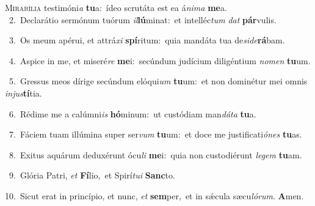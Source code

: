\lettrine{\initial\textcolor{\initialcolor}{M}}{irabília} testimóni\textit{a} \textbf{tu}\-a:~\star ídeo scrutáta est ea á\-\textit{ni}\-\textit{ma} \textbf{me}\-a.\\
{\numbfont\textcolor{\numbcolor}{~2.}}~Declarátio sermónum tuórum \textit{il}\-\textbf{lú}minat:~\star et intelléc\textit{tum} \textit{dat} \textbf{pár}\-vulis.\par
{\numbfont\textcolor{\numbcolor}{~3.}}~Os meum apérui, et attrá\textit{xi} \textbf{spí}\-ritum:~\star quia mandáta tua de\-\textit{si}\-\textit{de}\textbf{rá}bam.\par
{\numbfont\textcolor{\numbcolor}{~4.}}~Aspice in me, et miseré\textit{re} \textbf{me}\-i:~\star secúndum judícium diligéntium \textit{no}\-\textit{men} \textbf{tu}\-um.\par
{\numbfont\textcolor{\numbcolor}{~5.}}~Gressus meos dírige secúndum elóqui\textit{um} \textbf{tu}\-um:~\star et non dominétur mei omnis \textit{in}\-\textit{jus}\textbf{tí}tia.\par
{\numbfont\textcolor{\numbcolor}{~6.}}~Rédime me a calúmni\textit{is} \textbf{hó}\-minum:~\star ut custódiam man\-\textit{dá}\-\textit{ta} \textbf{tu}\-a.\par
{\numbfont\textcolor{\numbcolor}{~7.}}~Fáciem tuam illúmina super ser\textit{vum} \textbf{tu}\-um:~\star et doce me justificati\-\textit{ó}\-\textit{nes} \textbf{tu}\-as.\par
{\numbfont\textcolor{\numbcolor}{~8.}}~Exitus aquárum deduxérunt ócu\textit{li} \textbf{me}\-i:~\star quia non custodiérunt \textit{le}\-\textit{gem} \textbf{tu}\-am.\par
{\numbfont\textcolor{\numbcolor}{~9.}}~Glória Patri, \textit{et} \textbf{Fí}\-lio,~\star et Spirí\-\textit{tu}\-\textit{i} \textbf{Sanc}\-to.\par
{\numbfont\textcolor{\numbcolor}{10.}}~Sicut erat in princípio, et nunc, \textit{et} \textbf{sem}\-per,~\star et in sǽcula sæcu\-\textit{ló}\-\textit{rum}. \textbf{A}\-men.\par

